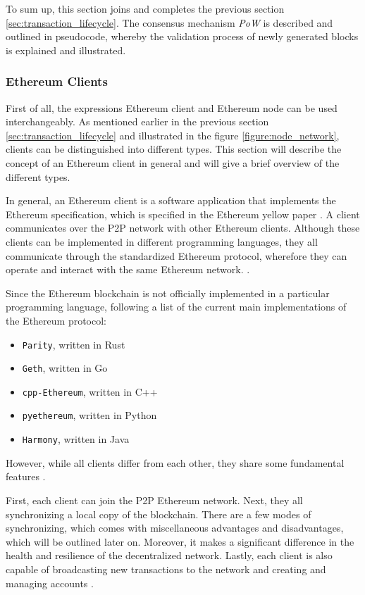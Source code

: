To sum up, this section joins and completes the previous section \ref{sec:transaction_lifecycle}.
The consensus mechanism \textit{PoW} is described and outlined in pseudocode, whereby
the validation process of newly generated blocks is explained and illustrated.
\clearpage

\subsubsection{Ethereum Clients}
\label{sec:nodes}

First of all, the expressions Ethereum client and Ethereum node can be used interchangeably. 
As mentioned earlier in the previous section \ref{sec:transaction_lifecycle} 
and illustrated in the figure \ref{figure:node_network}, clients can be distinguished into different types. 
This section will describe the concept of an Ethereum client in general and will give a brief overview of the different
types.

In general, an Ethereum client is a software application 
that implements the Ethereum specification, which is specified in the Ethereum yellow paper .
A client communicates over the P2P network with other Ethereum clients.
Although these clients can be implemented in different programming languages, they all communicate through
the standardized Ethereum protocol, wherefore they can operate and interact with the same Ethereum network. . 

Since the Ethereum blockchain is not officially implemented in a particular programming language, 
following a list of the current main implementations of the Ethereum protocol:

\begin{itemize}
	\item \texttt{Parity}, written in Rust
	\item \texttt{Geth}, written in Go
	\item \texttt{cpp-Ethereum}, written in C++
	\item \texttt{pyethereum}, written in Python
	\item \texttt{Harmony}, written in Java 
\end{itemize}

However, while all clients differ from each other, they share some fundamental features .

First, each client can join the P2P Ethereum network. 
Next, they all synchronizing a local copy of the blockchain.
There are a few modes of synchronizing, which comes with miscellaneous advantages and disadvantages, 
which will be outlined later on. Moreover, it makes a significant difference 
in the health and resilience of the decentralized network. 
Lastly, each client is also capable of broadcasting new transactions to the network and creating and 
managing accounts .

